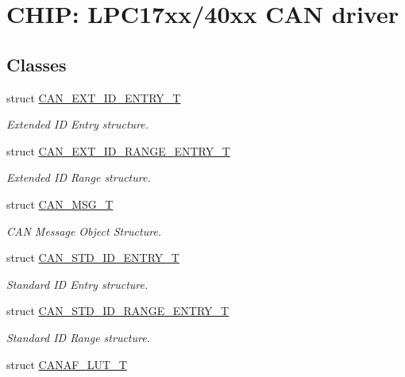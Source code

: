\hypertarget{group__CAN__17XX__40XX}{}\section{C\+H\+IP\+: L\+P\+C17xx/40xx C\+AN driver}
\label{group__CAN__17XX__40XX}
\subsection*{Classes}
\begin{DoxyCompactItemize}
\item 
struct \hyperlink{structCAN__EXT__ID__ENTRY__T}{C\+A\+N\+\_\+\+E\+X\+T\+\_\+\+I\+D\+\_\+\+E\+N\+T\+R\+Y\+\_\+T}
\begin{DoxyCompactList}\small\item\em Extended ID Entry structure. \end{DoxyCompactList}\item 
struct \hyperlink{structCAN__EXT__ID__RANGE__ENTRY__T}{C\+A\+N\+\_\+\+E\+X\+T\+\_\+\+I\+D\+\_\+\+R\+A\+N\+G\+E\+\_\+\+E\+N\+T\+R\+Y\+\_\+T}
\begin{DoxyCompactList}\small\item\em Extended ID Range structure. \end{DoxyCompactList}\item 
struct \hyperlink{structCAN__MSG__T}{C\+A\+N\+\_\+\+M\+S\+G\+\_\+T}
\begin{DoxyCompactList}\small\item\em C\+AN Message Object Structure. \end{DoxyCompactList}\item 
struct \hyperlink{structCAN__STD__ID__ENTRY__T}{C\+A\+N\+\_\+\+S\+T\+D\+\_\+\+I\+D\+\_\+\+E\+N\+T\+R\+Y\+\_\+T}
\begin{DoxyCompactList}\small\item\em Standard ID Entry structure. \end{DoxyCompactList}\item 
struct \hyperlink{structCAN__STD__ID__RANGE__ENTRY__T}{C\+A\+N\+\_\+\+S\+T\+D\+\_\+\+I\+D\+\_\+\+R\+A\+N\+G\+E\+\_\+\+E\+N\+T\+R\+Y\+\_\+T}
\begin{DoxyCompactList}\small\item\em Standard ID Range structure. \end{DoxyCompactList}\item 
struct \hyperlink{structCANAF__LUT__T}{C\+A\+N\+A\+F\+\_\+\+L\+U\+T\+\_\+T}

\end{DoxyCompactItemize}
